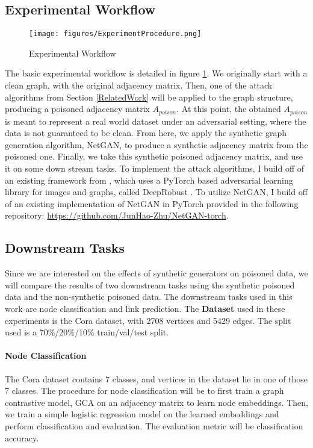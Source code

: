 \documentclass{article}
\begin{document}
\subsection{Experimental Workflow}

\begin{figure}[h]
\centering
\texttt{[image: figures/ExperimentProcedure.png]}
\caption{Experimental Workflow}
\label{exp-prcedure}
\end{figure}

The basic experimental workflow is detailed in figure \ref{exp-prcedure}. We originally start with a clean graph, with the original adjacency matrix. Then, one of the attack algorithms from Section \ref{RelatedWork} will be applied to the graph structure, producing a poisoned adjacency matrix $A_{poison}$. At this point, the obtained $A_{poison}$ is meant to represent a real world dataset under an adversarial setting, where the data is not guaranteed to be clean. From here, we apply the synthetic graph generation algorithm, NetGAN, to produce a synthetic adjacency matrix from the poisoned one. Finally, we take this synthetic poisoned adjacency matrix, and use it on some down stream tasks. To implement the attack algorithms, I build off of an existing framework from \cite{Zhang_2022}, which uses a PyTorch based adversarial learning library for images and graphs, called DeepRobust \cite{li2020deeprobust}. To utilize NetGAN, I build off of an existing implementation of NetGAN in PyTorch provided in the following repository: \url{https://github.com/JunHao-Zhu/NetGAN-torch}.

\subsection{Downstream Tasks}

Since we are interested on the effects of synthetic generators on poisoned data, we will compare the results of two downstream tasks using the synthetic poisoned data and the non-synthetic poisoned data. The downstream tasks used in this work are node classification and link prediction. The \textbf{Dataset} used in these experiments is the Cora dataset, with 2708 vertices and 5429 edges. The split used is a 70\%/20\%/10\% train/val/test split. 

\paragraph{Node Classification} 
The Cora dataset contains 7 classes, and vertices in the dataset lie in one of those 7 classes. The procedure for node classification will be to first train a graph contrastive model, GCA \cite{Zhu_2021_GCA} on an adjacency matrix to learn node embeddings. Then, we train a simple logistic regression model on the learned embeddings and perform classification and evaluation. The evaluation metric will be classification accuracy. 
\end{document}
